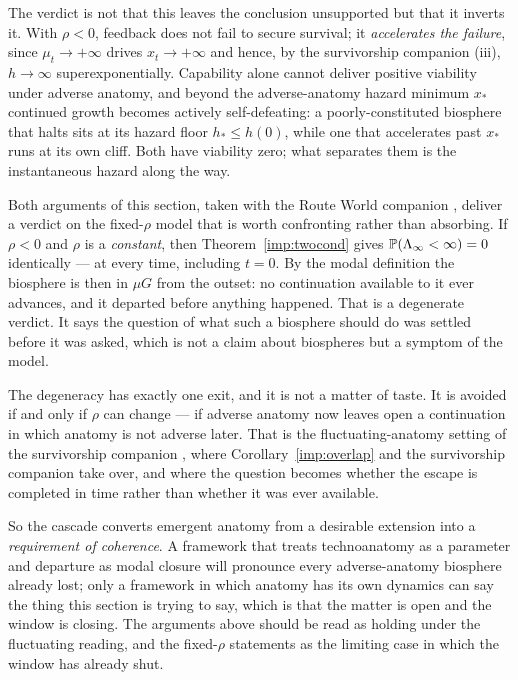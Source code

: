 The verdict is not that this leaves the conclusion unsupported but that
it inverts it. With $\rho<0$, feedback does not fail to secure survival;
it \emph{accelerates the failure}, since $\mu_t\to+\infty$ drives
$x_t\to+\infty$ and hence, by
the survivorship companion \cite{GoldenSurvivorship}(iii), $h\to\infty$
superexponentially. Capability alone cannot deliver positive viability
under adverse anatomy, and beyond the adverse-anatomy hazard minimum
$x_\ast$ continued growth becomes actively self-defeating: a
poorly-constituted biosphere that halts sits at its hazard floor
$h_\ast\le h(0)$, while one that accelerates past $x_\ast$ runs at its
own cliff. Both have viability zero; what separates them is the
instantaneous hazard along the way.

\begin{remark}
\label{hr:rem:forcesprocess}
Both arguments of this section, taken with
the Route World companion \cite{GoldenRouteWorld}, deliver a verdict on the fixed-$\rho$ model
that is worth confronting rather than absorbing. If $\rho<0$ and $\rho$ is a \emph{constant}, then
Theorem~\ref{imp:twocond} gives
$\mathbb{P}(\Lambda_\infty<\infty)=0$ identically --- at every time, including
$t=0$. By the modal definition the biosphere is then in $\mu G$ from the
outset: no continuation available to it ever advances, and it departed
before anything happened. That is a degenerate verdict. It says the
question of what such a biosphere should do was settled before it was
asked, which is not a claim about biospheres but a symptom of the
model.

The degeneracy has exactly one exit, and it is not a matter of taste.
It is avoided if and only if $\rho$ can change --- if adverse anatomy
now leaves open a continuation in which anatomy is not adverse later.
That is the fluctuating-anatomy setting of
the survivorship companion \cite{GoldenSurvivorship}, where
Corollary~\ref{imp:overlap} and
the survivorship companion \cite{GoldenSurvivorship} take over, and where the question
becomes whether the escape is completed in time rather than whether it
was ever available.

So the cascade converts emergent anatomy from a desirable extension
into a \emph{requirement of coherence}. A framework that treats
technoanatomy as a parameter and departure as modal closure will
pronounce every adverse-anatomy biosphere already lost; only a
framework in which anatomy has its own dynamics can say the thing this
section is trying to say, which is that the matter is open and the
window is closing. The arguments above should be read as holding under
the fluctuating reading, and the fixed-$\rho$ statements as the
limiting case in which the window has already shut.
\end{remark}

